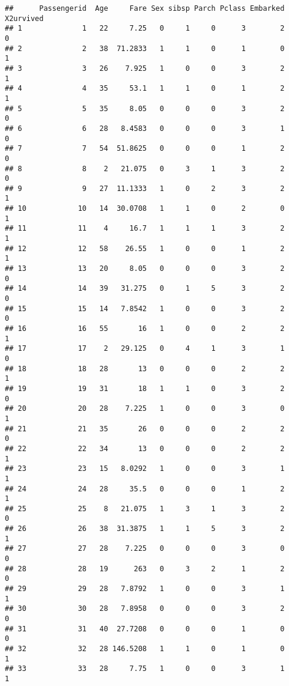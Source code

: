 \documentclass[
]{article}
\begin{document}
\begin{verbatim}
##      Passengerid  Age     Fare Sex sibsp Parch Pclass Embarked X2urvived
## 1              1   22     7.25   0     1     0      3        2         0
## 2              2   38  71.2833   1     1     0      1        0         1
## 3              3   26    7.925   1     0     0      3        2         1
## 4              4   35     53.1   1     1     0      1        2         1
## 5              5   35     8.05   0     0     0      3        2         0
## 6              6   28   8.4583   0     0     0      3        1         0
## 7              7   54  51.8625   0     0     0      1        2         0
## 8              8    2   21.075   0     3     1      3        2         0
## 9              9   27  11.1333   1     0     2      3        2         1
## 10            10   14  30.0708   1     1     0      2        0         1
## 11            11    4     16.7   1     1     1      3        2         1
## 12            12   58    26.55   1     0     0      1        2         1
## 13            13   20     8.05   0     0     0      3        2         0
## 14            14   39   31.275   0     1     5      3        2         0
## 15            15   14   7.8542   1     0     0      3        2         0
## 16            16   55       16   1     0     0      2        2         1
## 17            17    2   29.125   0     4     1      3        1         0
## 18            18   28       13   0     0     0      2        2         1
## 19            19   31       18   1     1     0      3        2         0
## 20            20   28    7.225   1     0     0      3        0         1
## 21            21   35       26   0     0     0      2        2         0
## 22            22   34       13   0     0     0      2        2         1
## 23            23   15   8.0292   1     0     0      3        1         1
## 24            24   28     35.5   0     0     0      1        2         1
## 25            25    8   21.075   1     3     1      3        2         0
## 26            26   38  31.3875   1     1     5      3        2         1
## 27            27   28    7.225   0     0     0      3        0         0
## 28            28   19      263   0     3     2      1        2         0
## 29            29   28   7.8792   1     0     0      3        1         1
## 30            30   28   7.8958   0     0     0      3        2         0
## 31            31   40  27.7208   0     0     0      1        0         0
## 32            32   28 146.5208   1     1     0      1        0         1
## 33            33   28     7.75   1     0     0      3        1         1

\end{verbatim}
\end{document}
